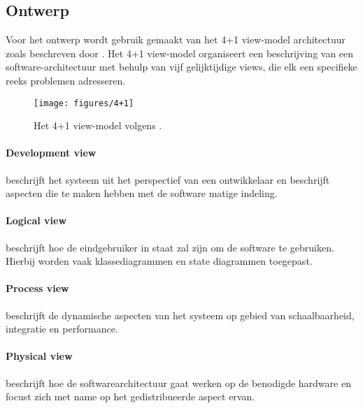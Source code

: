 \subsection{Ontwerp}

Voor het ontwerp wordt gebruik gemaakt van het 4+1 view-model architectuur zoals beschreven door \cite{kruchten19954+}. Het 4+1 view-model organiseert een beschrijving van een software-architectuur met behulp van vijf gelijktijdige views, die elk een specifieke reeks problemen adresseren.

\begin{wrapfigure}{r}{0.6\textwidth}
  \texttt{[image: figures/4+1]}
  \caption[4+1 view-model]{Het 4+1 view-model volgens \cite{kruchten19954+}.}
  \label{blockchain_architecture}
\end{wrapfigure}

\paragraph{Development view} beschrijft het systeem uit het perspectief van een ontwikkelaar en beschrijft aspecten die te maken hebben met de software matige indeling.

\paragraph{Logical view} beschrijft hoe de eindgebruiker in staat zal zijn om de software te gebruiken. Hierbij worden vaak klassediagrammen en state diagrammen toegepast.

\paragraph{Process view} beschrijft de dynamische aspecten van het systeem op gebied van schaalbaarheid, integratie en performance.

\paragraph{Physical view} beschrijft hoe de softwarearchitectuur gaat werken op de benodigde hardware en focust zich met name op het gedistribueerde aspect ervan.